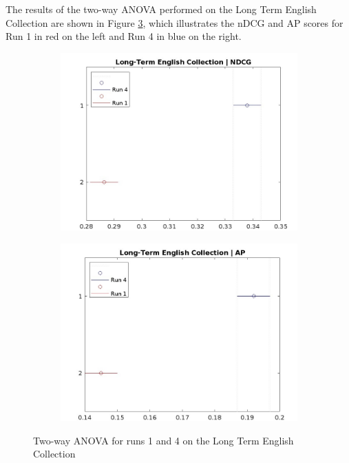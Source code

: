The results of the two-way \ac{ANOVA} performed on the Long Term English Collection are shown in Figure \ref{fig:lt_anova_eng}, which illustrates the \ac{nDCG} and \ac{AP} scores for Run 1 in red on the left and Run 4 in blue on the right. 

\begin{figure}[!h]
    \centering
    \begin{subfigure}[b]{0.49\textwidth}
        \centering
        \includegraphics[width=\textwidth]{figure/StatisticalAnalysis/ANOVA 2/ndcg-lt-en.jpeg}
        \label{fig:lt_anova_eng_ndcg}
    \end{subfigure}
    \hfill
    \begin{subfigure}[b]{0.49\textwidth}
        \centering
        \includegraphics[width=\textwidth]{figure/StatisticalAnalysis/ANOVA 2/ap-lt-en.jpeg}
        \label{fig:lt_anova_eng_ap}
    \end{subfigure}
    \caption{Two-way ANOVA for runs 1 and 4 on the Long Term English Collection}
    \label{fig:lt_anova_eng}
\end{figure}

